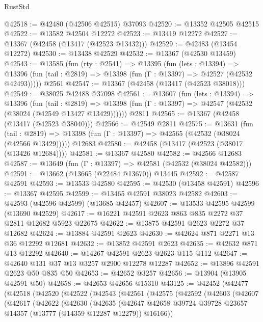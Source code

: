 \begin{lexlean}{RustStd}
\begin{coremodule}
@42518 := @42480 (@42506 @42515) @37093
@42520 := @13352 @42505 @42515
@42522 := @13582 @42504 @12272
@42523 := @13419 @12272
@42527 := @13367 (@42458 (@13417 (@42523 @13432)))
@42529 := @42483 (@13454 @12272)
@42530 := @13438 @42529
@42532 := @13367 (@42530 @13459)
@42543 := @13585
    (fun (rty : @2541) =>
    @13395
      (fun (lets : @13394) =>
      @13396 (fun (tail : @2819) => @13398 (fun (Γ : @13397) => @42527 (@42532 @42493)))))
    @2561
@42547 := @13367 (@42458 (@13417 (@42523 @38018)))
@42549 := @38025 @42488 @37098
@42561 := @13607
    (fun (lets : @13394) =>
    @13396
      (fun (tail : @2819) =>
      @13398 (fun (Γ : @13397) => @42547 (@42532 (@38024 (@42549 @13427 @13429))))))
    @2811
@42565 := @13367 (@42458 (@13417 (@42523 @38040)))
@42566 := @42549 @2811
@42575 := @13631
    (fun (tail : @2819) => @13398 (fun (Γ : @13397) => @42565 (@42532 (@38024 (@42566 @13429)))))
    @12683
@42580 := @42458 (@13417 (@42523 (@38017 (@13426 @12684))))
@42581 := @13367 @42580
@42582 := @42566 @12683
@42587 := @13649 (fun (Γ : @13397) => @42581 (@42532 (@38024 @42582)))
@42591 := @13662 (@13665 (@22484 @13670)) @13445
@42592 := @42587 @42591
@42593 := @13533 @42580
@42595 := @42530 (@13458 @42591)
@42596 := @13367 @42595
@42599 := @13465 @42591 @38023 @42582
@42603 := @42593 (@42596 @42599) (@13685 @42457)
@42607 := @13533 @42595 @42599 (@13690 @42529)
@42617 := @16221 @42591 @2623 @863 @835 @2272 @37 @2811 @12682 @5923 @22675
@42622 := @13875 @42591 @2623 @2272 @37 @12682
@42624 := @13884 @42591 @2623
@42630 := @42624 @871 @2271 @13 @36 @12292 @12681
@42632 := @13852 @42591 @2623
@42635 := @42632 @871 @13 @12292
@42640 := @14267 @42591 @2623 @2623 @115 @112
@42647 := @42640 @131 @37 @13 @3257 @2900 @12278 @12287
@42652 := @13896 @42591 @2623 @50 @835 @50
@42653 := @42652 @3257
@42656 := @13904 (@13905 @42591 @50)
@42658 := @42653 @42656 @15310
@43125 := @42452
    (@42477
      (@42518
        (@42520
          (@42522
            (@42543
              (@42561
                (@42575
                  (@42592
                    (@42603
                      (@42607
                        (@42617
                          (@42622
                            (@42630
                              (@42635
                                (@42647
                                  @42658
                                  @39724
                                  @39728
                                  @23657
                                  @14357
                                  (@13777 (@14359 @12287 @12279))
                                  @16166))

\end{coremodule}
\end{lexlean}
